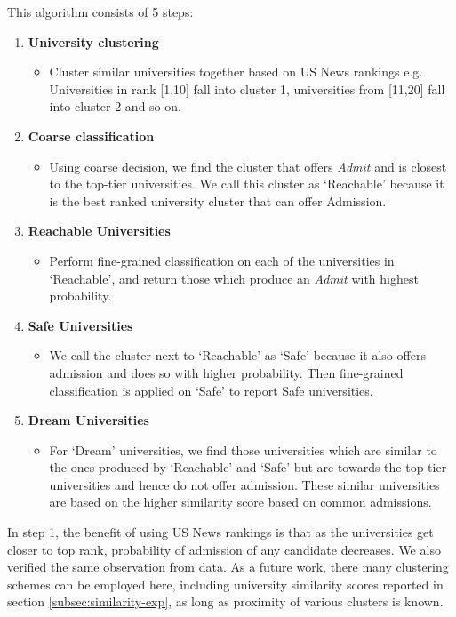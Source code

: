 \documentclass{sig-alternate-05-2015}
\begin{document}
This algorithm consists of 5 steps:
\begin {enumerate}
\item \textbf{University clustering}
    \begin {itemize}
    \item Cluster similar universities together based on US News rankings e.g. Universities in rank [1,10] fall into cluster 1, universities from [11,20] fall into cluster 2 and so on.
    \end {itemize}
\item \textbf {Coarse classification}
    \begin {itemize}
    \item Using coarse decision, we find the cluster that offers \textit{Admit} and is closest to the top-tier universities. We call this cluster as `Reachable' because it is the best ranked university cluster that can offer Admission.
    \end {itemize}
\item \textbf {Reachable Universities}
    \begin {itemize}
    \item Perform fine-grained classification on each of the universities in `Reachable', and return those which produce an \textit{Admit} with highest probability.
    \end {itemize}
\item \textbf {Safe Universities}
    \begin {itemize}
    \item We call the cluster next to `Reachable' as `Safe' because it also offers admission and does so with higher probability. Then fine-grained classification is applied on `Safe' to report Safe universities.
    \end {itemize}
\item \textbf {Dream Universities}
    \begin {itemize}
    \item For `Dream' universities, we find those universities which are similar to the ones produced by `Reachable' and `Safe' but are towards the top tier universities and hence do not offer admission. These similar universities are based on the higher similarity score based on common admissions.
    \end {itemize}
\end {enumerate}

In step 1, the benefit of using US News rankings is that as the universities get closer to top rank, probability of admission of any candidate decreases. We also verified the same observation from data. As a future work, there many clustering schemes can be employed here, including university similarity scores reported in section \ref{subsec:similarity-exp}, as long as proximity of various clusters is known.
\end{document}
